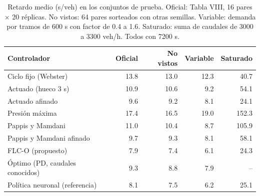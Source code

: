 \begin{table}[t]
\centering
\caption{Retardo medio (s/veh) en los conjuntos de prueba. Oficial: Tabla VIII, 16 pares $\times$ 20 r\'eplicas. No vistos: 64 pares sorteados con otras semillas. Variable: demanda por tramos de 600 s con factor de 0.4 a 1.6. Saturado: suma de caudales de 3000 a 3300 veh/h. Todos con 7200 s.}
\label{tab:conjuntos}
\scriptsize
\begin{tabular}{@{}lrrrr@{}}
\toprule
Controlador & Oficial & No vistos & Variable & Saturado \\
\midrule
Ciclo fijo (Webster) & 13.8 & 13.0 & 12.3 & 40.7 \\
Actuado (hueco 3 s) & 10.9 & 10.6 & 9.2 & 54.1 \\
Actuado afinado & 9.6 & 9.2 & 8.1 & 24.1 \\
Presión máxima & 17.4 & 16.5 & 19.0 & 152.3 \\
Pappis y Mamdani & 11.0 & 10.4 & 8.7 & 105.9 \\
Pappis y Mamdani afinado & 9.7 & 9.3 & 8.1 & 58.1 \\
FLC-O (propuesto) & 7.9 & 7.4 & 6.1 & 24.3 \\
Óptimo (PD, caudales conocidos) & 9.3 & 8.8 & 7.9 & -- \\
Política neuronal (referencia) & 8.1 & 7.5 & 6.2 & 25.1 \\
\bottomrule
\end{tabular}
\end{table}
